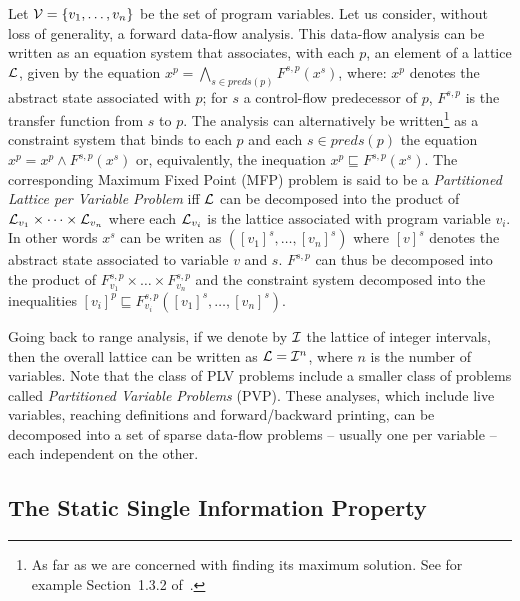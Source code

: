 \begin{definition}[PLV]
Let ${\cal V}=\{v_1,\dots,v_n\}$ be the set of program variables.
Let us consider, without loss of generality, a forward data-flow analysis.
This data-flow analysis can be written as an equation system that associates, with each \progpoint $p$, an element of a lattice ${\cal L}$, given by the equation $x^p = \bigwedge_{s \in \textit{preds}(p)} F^{s,p}(x^s)$, where: $x^p$ denotes the abstract state associated  with \progpoint $p$; for $s$ a control-flow predecessor of $p$, $F^{s,p}$ is the transfer function from $s$ to $p$.
The analysis can alternatively be written\footnote{As far as we are concerned with finding its maximum solution. See for example Section~1.3.2 of~\cite{Nielson05}.} as a constraint system that binds to each \progpoint $p$ and each $s\in \textit{preds}(p)$ the equation $x^p = x^p \wedge  F^{s,p}(x^s)$ or, equivalently, the inequation $x^p \sqsubseteq  F^{s,p}(x^s)$.
The corresponding Maximum Fixed Point (MFP) problem is said to be a \emph{Partitioned Lattice per Variable Problem} iff $\cal L$ can be decomposed into the product of ${\cal L}_{v_1}\times \dots \times {\cal L}_{v_n}$ where each ${\cal L}_{v_i}$ is the lattice associated with program variable $v_i$. In other words $x^s$ can be writen as $([v_1]^s,\dots,[v_n]^s)$ where $[v]^s$ denotes the abstract state associated to variable $v$ and \progpoint $s$. $F^{s,p}$ can thus be decomposed into the product of $F^{s,p}_{v_1}\times \dots\times F^{s,p}_{v_n}$ and the constraint system decomposed into the inequalities $[v_i]^p\sqsubseteq  F^{s,p}_{v_i}([v_1]^s,\dots,[v_n]^s)$.
\end{definition}

Going back to range analysis, if we denote by $\cal I$ the lattice of integer intervals, then the overall lattice can be written as ${\cal L}={\cal I}^n$, where $n$ is the number of variables.
%
Note that the class of PLV problems include a smaller class of problems called {\em Partitioned Variable Problems} (PVP).
These analyses, which include live variables, reaching definitions and forward/backward printing, can be decomposed into a set of sparse data-flow problems -- usually one per variable -- each independent on the other.

\subsection{The Static Single Information Property}
\label{sec:ssi:pereira:singProp}


